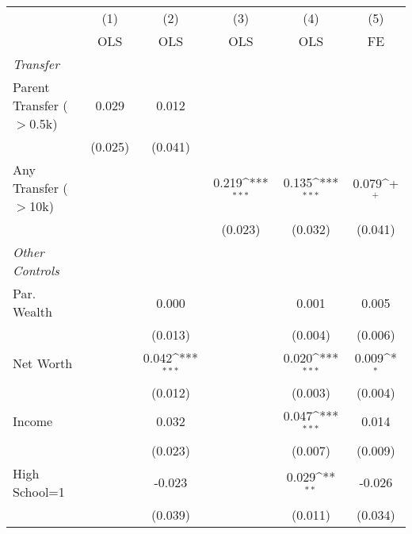 {
\def\sym#1{\ifmmode^{#1}\else\(^{#1}\)\fi}
\begin{tabular}{l*{5}{c}}
\toprule
                &\multicolumn{1}{c}{(1)}&\multicolumn{1}{c}{(2)}&\multicolumn{1}{c}{(3)}&\multicolumn{1}{c}{(4)}&\multicolumn{1}{c}{(5)}\\
                &\multicolumn{1}{c}{OLS}&\multicolumn{1}{c}{OLS}&\multicolumn{1}{c}{OLS}&\multicolumn{1}{c}{OLS}&\multicolumn{1}{c}{FE}\\
\midrule
\textit{Transfer}&                  &                  &                  &                  &                  \\
\;Parent Transfer ($>$0.5k)&    0.029         &    0.012         &                  &                  &                  \\
                &  (0.025)         &  (0.041)         &                  &                  &                  \\
\;Any Transfer ($>$10k)&                  &                  &    0.219\sym{***}&    0.135\sym{***}&    0.079\sym{+}  \\
                &                  &                  &  (0.023)         &  (0.032)         &  (0.041)         \\
\textit{Other Controls}&                  &                  &                  &                  &                  \\
\;Par. Wealth   &                  &    0.000         &                  &    0.001         &    0.005         \\
                &                  &  (0.013)         &                  &  (0.004)         &  (0.006)         \\
\;Net Worth     &                  &    0.042\sym{***}&                  &    0.020\sym{***}&    0.009\sym{*}  \\
                &                  &  (0.012)         &                  &  (0.003)         &  (0.004)         \\
\;Income        &                  &    0.032         &                  &    0.047\sym{***}&    0.014         \\
                &                  &  (0.023)         &                  &  (0.007)         &  (0.009)         \\
\;High School=1 &                  &   -0.023         &                  &    0.029\sym{**} &   -0.026         \\
                &                  &  (0.039)         &                  &  (0.011)         &  (0.034)         \\

\end{tabular}}
